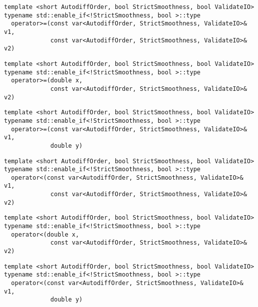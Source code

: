 \begin{tcolorbox}[colback=white,colframe=gray90, coltitle=black,boxrule=3pt,
fonttitle=\bfseries,title= Operator Greater Than Or Equal To]

\begin{verbatim}
template <short AutodiffOrder, bool StrictSmoothness, bool ValidateIO>
typename std::enable_if<!StrictSmoothness, bool >::type
  operator>=(const var<AutodiffOrder, StrictSmoothness, ValidateIO>& v1,
             const var<AutodiffOrder, StrictSmoothness, ValidateIO>& v2)

\end{verbatim}

\begin{verbatim}
template <short AutodiffOrder, bool StrictSmoothness, bool ValidateIO>
typename std::enable_if<!StrictSmoothness, bool >::type
  operator>=(double x,
             const var<AutodiffOrder, StrictSmoothness, ValidateIO>& v2)

\end{verbatim}

\begin{verbatim}
template <short AutodiffOrder, bool StrictSmoothness, bool ValidateIO>
typename std::enable_if<!StrictSmoothness, bool >::type
  operator>=(const var<AutodiffOrder, StrictSmoothness, ValidateIO>& v1,
             double y)

\end{verbatim}

\end{tcolorbox}

\begin{tcolorbox}[colback=white,colframe=gray90, coltitle=black,boxrule=3pt,
fonttitle=\bfseries,title= Operator Less Than]

\begin{verbatim}
template <short AutodiffOrder, bool StrictSmoothness, bool ValidateIO>
typename std::enable_if<!StrictSmoothness, bool >::type
  operator<(const var<AutodiffOrder, StrictSmoothness, ValidateIO>& v1,
             const var<AutodiffOrder, StrictSmoothness, ValidateIO>& v2)

\end{verbatim}

\begin{verbatim}
template <short AutodiffOrder, bool StrictSmoothness, bool ValidateIO>
typename std::enable_if<!StrictSmoothness, bool >::type
  operator<(double x,
             const var<AutodiffOrder, StrictSmoothness, ValidateIO>& v2)

\end{verbatim}

\begin{verbatim}
template <short AutodiffOrder, bool StrictSmoothness, bool ValidateIO>
typename std::enable_if<!StrictSmoothness, bool >::type
  operator<(const var<AutodiffOrder, StrictSmoothness, ValidateIO>& v1,
             double y)

\end{verbatim}

\end{tcolorbox}

